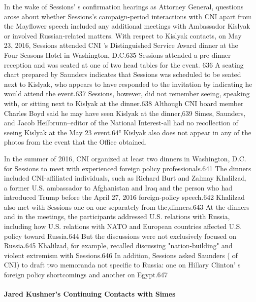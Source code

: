 In the wake of Sessions' s confirmation hearings as Attorney General, questions arose about whether Sessions's campaign-period interactions with CNI apart from the Mayflower speech included any additional meetings with Ambassador Kislyak or involved Russian-related matters. With respect to Kislyak contacts, on May 23, 2016, Sessions attended CNI 's Distinguished Service Award dinner at the Four Seasons Hotel in Washington, D.C.635 Sessions attended a  pre-dinner reception and was seated at one of two head tables for the event. 636 A seating chart prepared by Saunders indicates that Sessions was scheduled to be seated next to Kislyak, who appears to have responded to the invitation by indicating he would attend the event.637 Sessions, however, did not remember seeing, speaking with, or sitting next to Kislyak at the dinner.638 Although CNI board member Charles Boyd said he may have seen Kislyak at the dinner,639 Simes, Saunders, and Jacob Heilbrunn--editor of the National Interest-all had no recollection of seeing Kislyak at the May 23 event.64° Kislyak also does not appear in any of the photos from the event that the Office obtained.

In the summer of 2016, CNI organized at least two dinners  in Washington,  D.C.  for Sessions to meet with experienced foreign policy professionals.641 The dinners included CNI-affiliated individuals, such as Richard Burt and Zalmay Khalilzad, a  former U.S. ambassador to Afghanistan and Iraq and the person who had introduced Trump before the April 27, 2016 foreign-policy speech.642 Khalilzad also met with Sessions one-on-one separately from the,dinners.643 At the dinners and in the meetings,  the participants addressed U.S. relations with Russia, including how U.S. relations with NATO and European countries affected U.S. policy toward Russia.644 But the discussions were not exclusively focused on Russia.645 Khalilzad,  for example, recalled discussing "nation-building" and violent extremism with Sessions.646 In addition, Sessions asked Saunders ( of CNI) to draft two memoranda not specific to Russia: one on Hillary Clinton' s foreign policy shortcomings and another on Egypt.647

\paragraph{Jared Kushner's Continuing Contacts with Simes}

